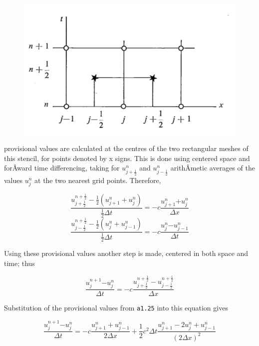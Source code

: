 \begin{figure}
 \centering
 \includegraphics[keepaspectratio]{figs/NM/pic11.jpg}
 \caption{} \label{fig:}
\end{figure}

provisional values are calculated at the centres of the two rectangular
meshes of this stencil, for points denoted by x signs. This is done
using centered space and forÂ­ward time differencing, taking for
\(u_{j + \frac{1}{2}}^{n}\) and \(u_{j - \frac{1}{2}}^{n}\) arithÂ­metic
averages of the values \(u_{j}^{n}\) at the two nearest grid points.
Therefore,

 {\[\frac{u_{j + \frac{1}{2}}^{n + \frac{1}{2}} - \frac{1}{2}\left( u_{j + 1}^{n} + u_{j}^{n} \right)}
{\frac{1}{2}\Delta t} = - c \frac{u_{j + 1}^{n}{+ u}_{j}^{n}}{\Delta x}\]\[\frac{u_{j - \frac{1}{2}}^{n + \frac{1}{2}} - \frac{1}{2}\left( u_{j}^{n} + u_{j - 1}^{n} \right)}{\frac{1}{2}\Delta t} = - c \frac{u_{j}^{n}{- u}_{j - 1}^{n}}{\Delta t}\]}

Using these provisional values another step is made, centered in both
space and time; thus

 {\[\frac{u_{j}^{n + 1}{- u}_{j}^{n}}{\Delta t} =
- c \frac{u_{j + \frac{1}{2}}^{n + \frac{1}{2}} - u_{j - \frac{1}{2}}^{n + \frac{1}{2}}}{\Delta x}\]}

Substitution of the provisional values from \texttt{a1.25} into this
equation gives

 {\[\frac{u_{j}^{n + 1}{- u}_{j}^{n}}{\Delta t} =
- c\frac{u_{j + 1}^{n} + u_{j - 1}^{n}}{2\Delta x} +
\frac{1}{2}c^{2}\Delta t\frac{u_{j + 1}^{n} - 2u_{j}^{n} + u_{j - 1}^{n}}
{\left( 2\Delta x \right)^{2}}\]}

